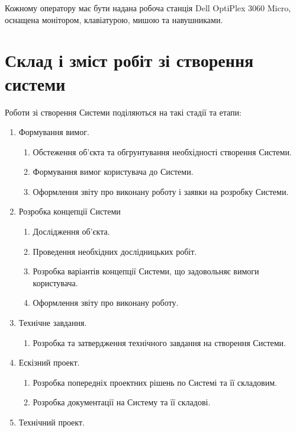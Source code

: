 \documentclass[
	a4paper,
	oneside,
	BCOR = 10mm,
	DIV = 12,
	12pt,
	headings = normal,
]{scrartcl}
\begin{document}
				Кожному оператору має бути надана робоча станція \textenglish{Dell OptiPlex 3060 Micro}, оснащена монітором, клавіатурою, мишою та навушниками.
		
	\section{Склад і зміст робіт зі створення системи}
		Роботи зі створення Системи поділяються на такі стадії та етапи:
		\begin{enumerate}[noitemsep]
			\item Формування вимог.
				\begin{enumerate}[noitemsep, topsep = 0\baselineskip]
					\item Обстеження об'єкта та обгрунтування необхідності створення Системи.
					\item Формування вимог користувача до Системи.
					\item Оформлення звіту про виконану роботу і заявки на розробку Системи.
				\end{enumerate}
			\item Розробка концепції Системи
				\begin{enumerate}[noitemsep, topsep = 0\baselineskip]
					\item Дослідження об'єкта.
					\item Проведення необхідних дослідницьких робіт.
					\item Розробка варіантів концепції Системи, що задовольняє вимоги користувача.
					\item Оформлення звіту про виконану роботу.
				\end{enumerate}
			\item Технічне завдання.
				\begin{enumerate}[noitemsep, topsep = 0\baselineskip]
					\item Розробка та затвердження технічного завдання на створення Системи.
				\end{enumerate}
			\item Ескізний проект.
				\begin{enumerate}[noitemsep, topsep = 0\baselineskip]
					\item Розробка попередніх проектних рішень по Системі та її складовим.
					\item Розробка документації на Систему та її складові.
				\end{enumerate}
			\item Технічний проект.
				\begin{enumerate}[noitemsep, topsep = 0\baselineskip]

\end{enumerate}
\end{enumerate}
\end{document}
